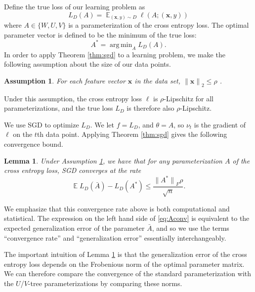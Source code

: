 \documentclass[twoside]{article}
\newtheorem{assumption}{Assumption}
\newtheorem{lemma}{Lemma}
\DeclareMathOperator{\E}{\mathbb E}
\DeclareMathOperator*{\argmin}{arg\,min}
\renewcommand{\star}[1]{{#1}^{*}}
\newcommand{\x}{\mathbf x}
\newcommand{\ltwo}[1]{{\lVert {#1} \rVert}_2}
\newcommand{\lF}[1]{{\lVert {#1} \rVert}_F}
\begin{document}
Define the true loss of our learning problem as
\begin{equation}
    L_D(A) = \E_{(\x,y)\sim D} \ell(A; (\x, y))
\end{equation}
where $A \in \{W, U, V\}$ is a parameterization of the cross entropy loss.
The optimal parameter vector is defined to be the minimum of the true loss:
\begin{equation}
    \star A = \argmin_{A} L_D(A).
\end{equation}
In order to apply Theorem \ref{thm:sgd} to a learning problem,
we make the following assumption about the size of our data points.
\begin{assumption}
    \label{ass:lip}
    For each feature vector $\x$ in the data set, 
        $\ltwo{\x} \le \rho$
        .
\end{assumption}
Under this assumption, the cross entropy loss $\ell$ is $\rho$-Lipschitz for all parameterizations,
and the true loss $L_D$ is therefore also $\rho$-Lipschitz.

We use SGD to optimize $L_D$.
We let $f=L_D$, and $\theta = A$,
so $\nu_t$ is the gradient of $\ell$ on the $t$th data point.
Applying Theorem \ref{thm:sgd} gives the following convergence bound.
\begin{lemma}
    \label{ref:cor:A}
    Under Assumption \ref{ass:lip},
    we have that for any parameterization $A$ of the cross entropy loss,
    SGD converges at the rate
    \begin{equation}
        \E L_D(\bar A) - L_D(\star A) \le \frac{\lF{\star A}\rho}{\sqrt n}.
        \label{eq:Aconv}
    \end{equation}
\end{lemma}

We emphasize that this convergence rate above is both computational and statistical.
The expression on the left hand side of \eqref{eq:Aconv} is equivalent to the expected generalization error of the parameter $\bar A$,
and so we use the terms ``convergence rate'' and ``generalization error'' essentially interchangeably.

The important intuition of Lemma \ref{ref:cor:A} is that the generalization error of the cross entropy loss depends on the Frobenious norm of the optimal parameter matrix.
We can therefore compare the convergence of the standard parameterization with the $U$/$V$-tree parameterizations by comparing these norms.
\end{document}
